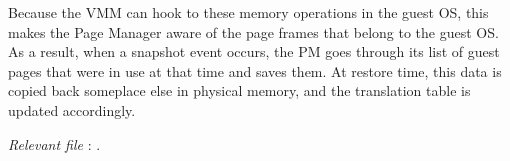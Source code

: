 Because the \gls{VMM} can hook to these memory operations in the guest OS, this makes the Page Manager aware of the page frames that belong to the guest OS. As a result, when a snapshot event occurs, the PM goes through its list of guest pages that were in use at that time and saves them. At restore time, this data is copied back someplace else in physical memory, and the translation table is updated accordingly.
 
\hfill\textit{Relevant file }: .